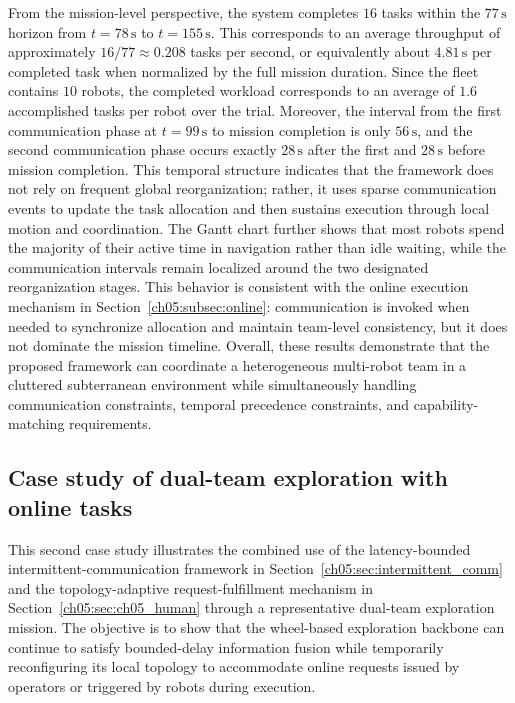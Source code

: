 From the mission-level perspective, the system completes
$16$ tasks within the $77\,\mathrm{s}$ horizon from
$t=78\,\mathrm{s}$ to $t=155\,\mathrm{s}$. This corresponds to
an average throughput of approximately
$16/77 \approx 0.208$ tasks per second, or equivalently about
$4.81\,\mathrm{s}$ per completed task when normalized by the
full mission duration. Since the fleet contains $10$ robots,
the completed workload corresponds to an average of
$1.6$ accomplished tasks per robot over the trial. Moreover,
the interval from the first communication phase at
$t=99\,\mathrm{s}$ to mission completion is only
$56\,\mathrm{s}$, and the second communication phase occurs
exactly $28\,\mathrm{s}$ after the first and $28\,\mathrm{s}$
before mission completion. This temporal structure indicates
that the framework does not rely on frequent global
reorganization; rather, it uses sparse communication events to
update the task allocation and then sustains execution through
local motion and coordination.
The Gantt chart further shows that most robots spend the
majority of their active time in navigation rather than idle
waiting, while the communication intervals remain localized
around the two designated reorganization stages. This behavior
is consistent with the online execution mechanism in
Section~\ref{ch05:subsec:online}: communication is invoked when
needed to synchronize allocation and maintain team-level
consistency, but it does not dominate the mission timeline.
Overall, these results demonstrate that the proposed
framework can coordinate a heterogeneous multi-robot team in a
cluttered subterranean environment while simultaneously
handling communication constraints, temporal precedence
constraints, and capability-matching requirements.

\subsection{Case study of dual-team exploration with online tasks}
\label{ch05:subsec:case_dual_team_exploration}

This second case study illustrates the combined use of the
latency-bounded intermittent-communication framework in
Section~\ref{ch05:sec:intermittent_comm} and the topology-adaptive
request-fulfillment mechanism in Section~\ref{ch05:sec:ch05_human}
through a representative dual-team exploration mission. The
objective is to show that the wheel-based exploration backbone
can continue to satisfy bounded-delay information fusion while
temporarily reconfiguring its local topology to accommodate
online requests issued by operators or triggered by robots
during execution.

